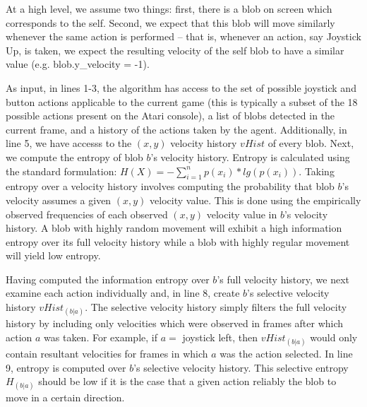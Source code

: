 \documentclass{acm_proc_article-sp}
\begin{document}
At a high level, we assume two things: first, there is a blob on screen which corresponds to the self. Second, we expect that this blob will move similarly whenever the same action is performed -- that is, whenever an action, say Joystick Up, is taken, we expect the resulting velocity of the self blob to have a similar value (e.g. blob.y\_velocity = -1). 

As input, in lines 1-3, the algorithm has access to the set of possible joystick and button actions applicable to the current game (this is typically a subset of the 18 possible actions present on the Atari console), a list of blobs detected in the current frame, and a history of the actions taken by the agent. Additionally, in line 5, we have accesss to the $(x,y)$ velocity history $vHist$ of every blob. Next, we compute the entropy of blob $b$'s velocity history. Entropy is calculated using the standard formulation: $H(X) = -\sum_{i=1}^n{p(x_i)*lg(p(x_i))}$. Taking entropy over a velocity history involves computing the probability that blob $b$'s velocity assumes a given $(x,y)$ velocity value. This is done using the empirically observed frequencies of each observed $(x,y)$ velocity value in $b$'s velocity history. A blob with highly random movement will exhibit a high information entropy over its full velocity history while a blob with highly regular movement will yield low entropy.

Having computed the information entropy over $b$'s full velocity history, we next examine each action individually and, in line 8, create $b$'s selective velocity history $vHist_{(b|a)}$. The selective velocity history simply filters the full velocity history by including only velocities which were observed in frames after which action $a$ was taken. For example, if $a = $ joystick left, then $vHist_{(b|a)}$ would only contain resultant velocities for frames in which $a$ was the action selected. In line 9, entropy is computed over $b$'s selective velocity history. This selective entropy $H_{(b|a)}$ should be low if it is the case that a given action reliably the blob to move in a certain direction.

\label{sec:interface}
\end{document}
